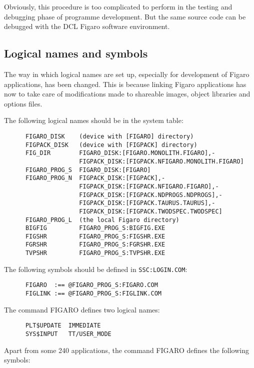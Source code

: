 Obviously, this procedure is too complicated to perform in the testing and
debugging phase of programme development. But the same source code can be
debugged with the DCL Figaro software environment.

\subsection{Logical names and symbols}
\label{names}

The way in which logical names are set up, especially for development of Figaro
applications, has been changed. This is because linking Figaro applications has
now to take care of modifications made to shareable images, object libraries
and options files.

The following logical names should be in the system table:

\begin{verbatim}
      FIGARO_DISK    (device with [FIGARO] directory)
      FIGPACK_DISK   (device with [FIGPACK] directory)
      FIG_DIR        FIGARO_DISK:[FIGARO.MONOLITH.FIGARO],-
                     FIGPACK_DISK:[FIGPACK.NFIGARO.MONOLITH.FIGARO]
      FIGARO_PROG_S  FIGARO_DISK:[FIGARO]
      FIGARO_PROG_N  FIGPACK_DISK:[FIGPACK],-
                     FIGPACK_DISK:[FIGPACK.NFIGARO.FIGARO],-
                     FIGPACK_DISK:[FIGPACK.NDPROGS.NDPROGS],-
                     FIGPACK_DISK:[FIGPACK.TAURUS.TAURUS],-
                     FIGPACK_DISK:[FIGPACK.TWODSPEC.TWODSPEC]
      FIGARO_PROG_L  (the local Figaro directory)
      BIGFIG         FIGARO_PROG_S:BIGFIG.EXE
      FIGSHR         FIGARO_PROG_S:FIGSHR.EXE
      FGRSHR         FIGARO_PROG_S:FGRSHR.EXE
      TVPSHR         FIGARO_PROG_S:TVPSHR.EXE
\end{verbatim}

The following symbols should be defined in {\tt SSC:LOGIN.COM}:

\begin{verbatim}
      FIGARO  :== @FIGARO_PROG_S:FIGARO.COM
      FIGLINK :== @FIGARO_PROG_S:FIGLINK.COM
\end{verbatim}

The command FIGARO defines two logical names:

\begin{verbatim}
      PLT$UPDATE  IMMEDIATE
      SYS$INPUT   TT/USER_MODE
\end{verbatim}

Apart from some 240 applications, the command FIGARO defines the following
symbols:

